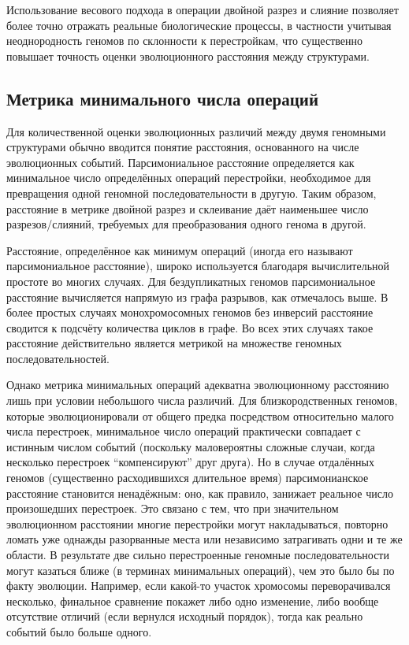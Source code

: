 Использование весового подхода в операции двойной разрез и слияние позволяет более точно отражать реальные биологические процессы, в частности учитывая неоднородность геномов по склонности к перестройкам, что существенно повышает точность оценки эволюционного расстояния между структурами.

\subsection{Метрика минимального числа операций}
\label{sec:minimal_operations}

Для количественной оценки эволюционных различий между двумя геномными структурами обычно вводится понятие расстояния, основанного на числе эволюционных событий.
Парсимониальное расстояние определяется как минимальное число определённых операций перестройки, необходимое для превращения одной геномной последовательности в другую.
Таким образом, расстояние в метрике двойной разрез и склеивание даёт наименьшее число разрезов/слияний, требуемых для преобразования одного генома в другой.

Расстояние, определённое как минимум операций (иногда его называют парсимониальное расстояние), широко используется благодаря вычислительной простоте во многих случаях.
Для бездупликатных геномов парсимониальное расстояние вычисляется напрямую из графа разрывов, как отмечалось выше.
В более простых случаях монохромосомных геномов без инверсий расстояние сводится к подсчёту количества циклов в графе.
Во всех этих случаях такое расстояние действительно является метрикой на множестве геномных последовательностей.

Однако метрика минимальных операций адекватна эволюционному расстоянию лишь при условии небольшого числа различий.
Для близкородственных геномов, которые эволюционировали от общего предка посредством относительно малого числа перестроек, минимальное число операций практически совпадает с истинным числом событий (поскольку маловероятны сложные случаи, когда несколько перестроек ``компенсируют'' друг друга).
Но в случае отдалённых геномов (существенно расходившихся длительное время) парсимонианское расстояние становится ненадёжным: оно, как правило, занижает реальное число произошедших перестроек.
Это связано с тем, что при значительном эволюционном расстоянии многие перестройки могут накладываться, повторно ломать уже однажды разорванные места или независимо затрагивать одни и те же области.
В результате две сильно перестроенные геномные последовательности могут казаться ближе (в терминах минимальных операций), чем это было бы по факту эволюции.
Например, если какой-то участок хромосомы переворачивался несколько, финальное сравнение покажет либо одно изменение, либо вообще отсутствие отличий (если вернулся исходный порядок), тогда как реально событий было больше одного.

